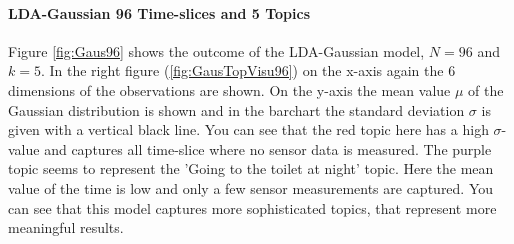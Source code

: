 \documentclass[11pt,a4paper]{article}
\begin{document}
\paragraph{LDA-Gaussian 96 Time-slices and 5 Topics}
Figure \ref{fig:Gaus96} shows the outcome of the LDA-Gaussian model, $N=96$ and $k=5$. In the right figure (\ref{fig:GausTopVisu96}) on the x-axis again the 6 dimensions of the observations are shown. On the y-axis the mean value $\mu$ of the Gaussian distribution is shown and in the barchart the standard deviation $\sigma$ is given with a vertical black line. You can see that the red topic here has a high $\sigma$-value and captures all time-slice where no sensor data is measured. The purple topic seems to represent the 'Going to the toilet at night' topic. Here the mean value of the time is low and only a few sensor measurements are captured. You can see that this model captures more sophisticated topics, that represent more meaningful results.
\end{document}
